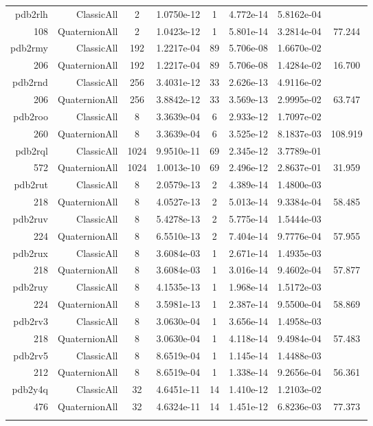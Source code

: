\begin{xltabular}{\textwidth}{r|rcS[table-format=1.4e+2]cS[table-format=1.3e+2]S[table-format=1.4e+2]S[table-format=-1.3]}
pdb2rlh & ClassicAll & 2 & 1.0750e-12 & 1 & 4.772e-14 & 5.8162e-04 & \\
108 & QuaternionAll & 2 & 1.0423e-12 & 1 & 5.801e-14 & 3.2814e-04 & 77.244\\  \addlinespace
pdb2rmy & ClassicAll & 192 & 1.2217e-04 & 89 & 5.706e-08 & 1.6670e-02 & \\
206 & QuaternionAll & 192 & 1.2217e-04 & 89 & 5.706e-08 & 1.4284e-02 & 16.700\\  \addlinespace
pdb2rnd & ClassicAll & 256 & 3.4031e-12 & 33 & 2.626e-13 & 4.9116e-02 & \\
206 & QuaternionAll & 256 & 3.8842e-12 & 33 & 3.569e-13 & 2.9995e-02 & 63.747\\  \addlinespace
pdb2roo & ClassicAll & 8 & 3.3639e-04 & 6 & 2.933e-12 & 1.7097e-02 & \\
260 & QuaternionAll & 8 & 3.3639e-04 & 6 & 3.525e-12 & 8.1837e-03 & 108.919\\  \addlinespace
pdb2rql & ClassicAll & 1024 & 9.9510e-11 & 69 & 2.345e-12 & 3.7789e-01 & \\
572 & QuaternionAll & 1024 & 1.0013e-10 & 69 & 2.496e-12 & 2.8637e-01 & 31.959\\  \addlinespace
pdb2rut & ClassicAll & 8 & 2.0579e-13 & 2 & 4.389e-14 & 1.4800e-03 & \\
218 & QuaternionAll & 8 & 4.0527e-13 & 2 & 5.013e-14 & 9.3384e-04 & 58.485\\  \addlinespace
pdb2ruv & ClassicAll & 8 & 5.4278e-13 & 2 & 5.775e-14 & 1.5444e-03 & \\
224 & QuaternionAll & 8 & 6.5510e-13 & 2 & 7.404e-14 & 9.7776e-04 & 57.955\\  \addlinespace
pdb2rux & ClassicAll & 8 & 3.6084e-03 & 1 & 2.671e-14 & 1.4935e-03 & \\
218 & QuaternionAll & 8 & 3.6084e-03 & 1 & 3.016e-14 & 9.4602e-04 & 57.877\\  \addlinespace
pdb2ruy & ClassicAll & 8 & 4.1535e-13 & 1 & 1.968e-14 & 1.5172e-03 & \\
224 & QuaternionAll & 8 & 3.5981e-13 & 1 & 2.387e-14 & 9.5500e-04 & 58.869\\  \addlinespace
pdb2rv3 & ClassicAll & 8 & 3.0630e-04 & 1 & 3.656e-14 & 1.4958e-03 & \\
218 & QuaternionAll & 8 & 3.0630e-04 & 1 & 4.118e-14 & 9.4984e-04 & 57.483\\  \addlinespace
pdb2rv5 & ClassicAll & 8 & 8.6519e-04 & 1 & 1.145e-14 & 1.4488e-03 & \\
212 & QuaternionAll & 8 & 8.6519e-04 & 1 & 1.338e-14 & 9.2656e-04 & 56.361\\  \addlinespace
pdb2y4q & ClassicAll & 32 & 4.6451e-11 & 14 & 1.410e-12 & 1.2103e-02 & \\
476 & QuaternionAll & 32 & 4.6324e-11 & 14 & 1.451e-12 & 6.8236e-03 & 77.373\\  \addlinespace
\end{xltabular}

